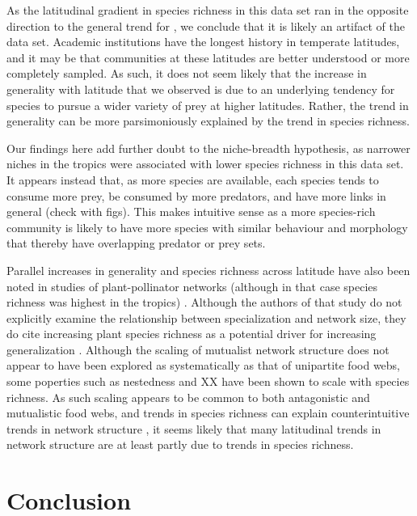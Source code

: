 \documentclass[12pt]{article}
\begin{document}
As the latitudinal gradient in species richness in this data set ran in the
opposite direction to the general trend for \citep{}, we conclude that it is
likely an artifact of the data set. Academic institutions have the longest
history in temperate latitudes, and it may be that communities at these
latitudes are better understood or more completely sampled. As such, it does not seem likely that the increase in
generality with latitude that we observed is due to an underlying tendency for
species to pursue a wider variety of prey at higher latitudes. Rather, the
trend in generality can be more parsimoniously explained by the trend in
species richness.


Our findings here add further doubt to the niche-breadth hypothesis, as
narrower niches in the tropics were associated with lower species richness in
this data set. It appears instead that, as more species are available, each
species tends to consume more prey, be consumed by more predators, and have
more links in general (check with figs). This makes intuitive sense as a more
species-rich community is likely to have more species with similar behaviour
and morphology that thereby have overlapping predator or prey sets.


Parallel increases in generality and species richness across latitude have
also been noted in studies of plant-pollinator networks (although in that case
species richness was highest in the tropics) \citep{Schleuning2012}. Although
the authors of that study do not explicitly examine the relationship between
specialization and network size, they do cite increasing plant species
richness as a potential driver for increasing generalization
\citep{Schleuning2012}. Although the scaling of mutualist network structure
does not appear to have been explored as systematically as that of unipartite
food webs, some poperties such as nestedness \citep{Vazquez2004} and XX
\citep{} have been shown to scale with species richness. As such scaling
appears to be common to both antagonistic and mutualistic food webs, and
trends in species richness can explain counterintuitive trends in network
structure \citep{Schleuning2012}, it seems likely that many latitudinal trends
in network structure are at least partly due to trends in species richness.




\section*{Conclusion}
\end{document}

